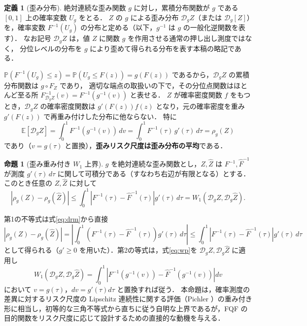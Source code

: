 \documentclass[a4paper,10pt]{jsarticle}
\makeatletter
\theoremstyle{definition}
\newtheorem{definition}{定義}[section]
\newtheorem{proposition}{命題}[section]
\renewenvironment{proof}[1][\proofname]{\par
  \pushQED{\qed}%
  \normalfont \topsep6\p@\@plus6\p@\relax
  \trivlist
  \item[\hskip\labelsep\textbf{#1}]\ignorespaces
}{%
  \popQED\endtrivlist\@endpefalse
}
\renewcommand{\proofname}{証明}
\newcommand{\Wone}{W_1}
\newcommand{\Finv}{F^{-1}}
\newcommand{\Fhinv}{\hat{F}^{-1}}
\newcommand{\E}{\mathbb{E}}
\newcommand{\Prob}{\mathbb{P}}
\newcommand{\dist}{\mathcal{D}_g}
\makeatother
\begin{document}
\begin{definition}[歪み分布]
\label{def:distorted}
絶対連続な歪み関数 $g$ に対し，累積分布関数が $g$ である $[0,1]$ 上の確率変数 $U_g$ をとる．
$Z$ の $g$ による歪み分布 $\dist Z$（または $\mathcal{D}_g[Z]$）を，確率変数 $\Finv(U_g)$ の分布と定める（以下，$g^{-1}$ は $g$ の一般化逆関数を表す）．
なお記号 $\dist Z$ は，値 $Z$ に関数 $g$ を作用させる通常の押し出し測度ではなく，
分位レベルの分布を $g$ により歪めて得られる分布を表す本稿の略記である．
\end{definition}
$\Prob(\Finv(U_g)\le z)=\Prob(U_g\le F(z))=g(F(z))$ であるから，$\dist Z$ の累積分布関数は $g\circ F_Z$ であり，
適切な端点の取扱いの下で，その分位点関数はほとんど至る所
$F^{-1}_{\dist Z}(v)=\Finv(g^{-1}(v))$ と表せる．
$Z$ が確率密度関数 $f$ をもつとき，$\dist Z$ の確率密度関数は $g'(F(z))f(z)$ となり，元の確率密度を重み $g'(F(z))$ で再重み付けした分布に他ならない．
特に
\begin{equation}
  \E[\dist Z]=\int_0^1\Finv(g^{-1}(v))\,dv=\int_0^1\Finv(\tau)\,g'(\tau)\,d\tau=\rho_g(Z)
  \label{eq:drm-as-mean}
\end{equation}
であり（$v=g(\tau)$ と置換），\textbf{歪みリスク尺度は歪み分布の平均}である．

\begin{proposition}[歪み重み付き $\Wone$ 上界]
\label{prop:bound}
$g$ を絶対連続な歪み関数とし，$Z,\hat Z$ は $\Finv,\Fhinv$ が測度 $g'(\tau)\,d\tau$ に関して可積分である（すなわち右辺が有限となる）とする．このとき任意の $Z,\hat Z$ に対して
\begin{equation}
  \left|\rho_g(Z)-\rho_g(\hat Z)\right|
  \le\int_0^1\left|\Finv(\tau)-\Fhinv(\tau)\right|g'(\tau)\,d\tau
  =\Wone(\dist Z,\dist\hat Z).
  \label{eq:bound}
\end{equation}
\end{proposition}
\begin{proof}
第1の不等式は式\eqref{eq:drm}から直接
\begin{equation*}
  \left|\rho_g(Z)-\rho_g(\hat Z)\right|=\left|\int_0^1\left(\Finv(\tau)-\Fhinv(\tau)\right)g'(\tau)\,d\tau\right|
  \le\int_0^1\left|\Finv(\tau)-\Fhinv(\tau)\right|g'(\tau)\,d\tau
\end{equation*}
として得られる（$g'\ge0$ を用いた）．第2の等式は，式\eqref{eq:wp}を $\dist Z,\dist\hat Z$ に適用し
\begin{equation*}
  \Wone(\dist Z,\dist\hat Z)=\int_0^1\left|\Finv(g^{-1}(v))-\Fhinv(g^{-1}(v))\right|dv
\end{equation*}
において $v=g(\tau)$，$dv=g'(\tau)d\tau$ と置換すれば従う．
\end{proof}
本命題は，確率測度の差異に対するリスク尺度の Lipschitz 連続性に関する評価（Pichler \cite{pichler2013evaluations}）の重み付き形に相当し，初等的な三角不等式から直ちに従う自明な上界であるが，FQF の目的関数をリスク尺度に応じて設計するための直接的な動機を与える．
\end{document}
